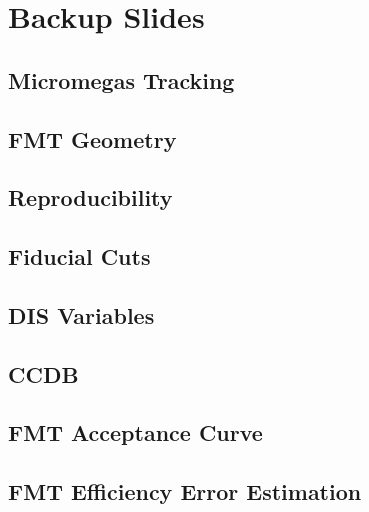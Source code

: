 \section*{}
\begin{frame}{}
    \centering \Huge{}
\end{frame}

\section*{Backup Slides}
\subsection*{Micromegas Tracking}


\subsection*{FMT Geometry}


\subsection*{Reproducibility}


\subsection*{Fiducial Cuts}


\subsection*{DIS Variables}


\subsection*{CCDB}


\subsection*{FMT Acceptance Curve}


\subsection*{FMT Efficiency Error Estimation}


